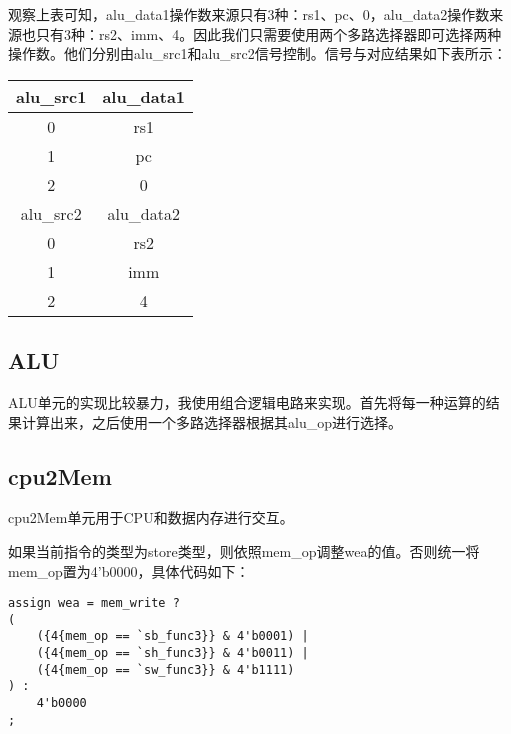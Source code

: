 \documentclass{article}
\begin{document}
            \par{}
            观察上表可知，alu\_data1操作数来源只有3种：rs1、pc、0，alu\_data2操作数来源也只有3种：rs2、imm、4。因此我们只需要使用两个多路选择器即可选择两种操作数。他们分别由alu\_src1和alu\_src2信号控制。信号与对应结果如下表所示： 

            \begin{center}
                \begin{tabular}{|c|c|}
                \hline
                alu\_src1 & alu\_data1 \\
                \hline
                0 & rs1 \\
                1 & pc \\
                2 & 0 \\
                \hline
                alu\_src2 & alu\_data2 \\
                \hline
                0 & rs2 \\
                1 & imm \\
                2 & 4 \\
                \hline
                \end{tabular}
            \end{center}

        \subsection{ALU}
            \par{}
            ALU单元的实现比较暴力，我使用组合逻辑电路来实现。首先将每一种运算的结果计算出来，之后使用一个多路选择器根据其alu\_op进行选择。

        \subsection{cpu2Mem}
            \par{}
            cpu2Mem单元用于CPU和数据内存进行交互。
            \par{}
            如果当前指令的类型为store类型，则依照mem\_op调整wea的值。否则统一将mem\_op置为4'b0000，具体代码如下：
            
            \begin{verbatim}
assign wea = mem_write ? 
(
    ({4{mem_op == `sb_func3}} & 4'b0001) |
    ({4{mem_op == `sh_func3}} & 4'b0011) |
    ({4{mem_op == `sw_func3}} & 4'b1111)
) :
    4'b0000
;
            \end{verbatim}
\end{document}
